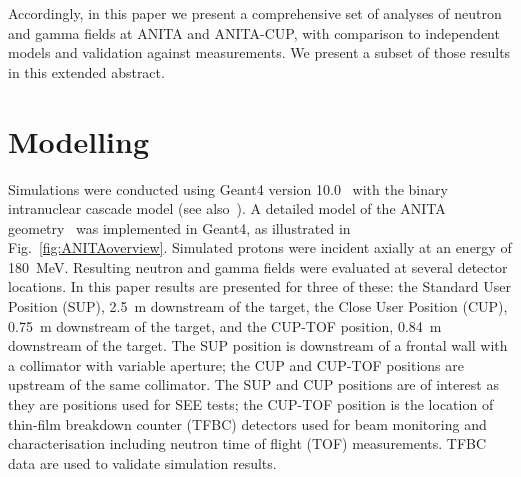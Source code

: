 \documentclass[peerreviewca,11pt,a4paper]{IEEEtran}
\begin{document}
Accordingly, in this paper we present a comprehensive set of analyses of neutron and gamma fields at ANITA and ANITA-CUP, with comparison to independent models and validation against measurements.
We present a subset of those results in this extended abstract.

\section{Modelling}
Simulations were conducted using Geant4 version 10.0~\cite{Agostinelli2003,Allison2006} with the binary intranuclear cascade model (see also~\cite{Platt2013}).
A detailed model of the ANITA geometry~\cite{Prokofiev2009,Prokofiev2014} was implemented in Geant4, as illustrated in Fig.~\ref{fig:ANITAoverview}.
Simulated protons were incident axially at an energy of \SI{180}{\MeV}.
Resulting neutron and gamma fields were evaluated at several detector locations.
In this paper results are presented for three of these: the Standard User Position (SUP), \SI{2.5}{\m} downstream of the target, the Close User Position (CUP), \SI{0.75}{\m} downstream of the target, and the CUP-TOF position, \SI{0.84}{m} downstream of the target.
The SUP position is downstream of a frontal wall with a collimator with variable aperture; the CUP and CUP-TOF positions are upstream of the same collimator.
The SUP and CUP positions are of interest as they are positions used for SEE tests; the CUP-TOF position is the location of thin-film breakdown counter (TFBC) detectors used for beam monitoring and characterisation including neutron time of flight (TOF) measurements.
TFBC data are used to validate simulation results.
\end{document}
